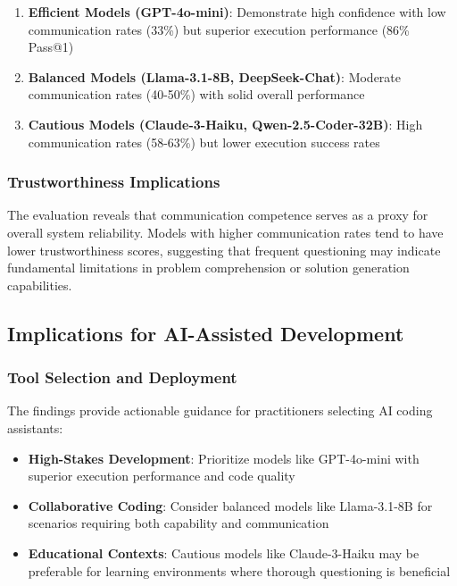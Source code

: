\documentclass[conference]{IEEEtran}
\begin{document}
\begin{enumerate}
    \item \textbf{Efficient Models (GPT-4o-mini)}: Demonstrate high confidence with low communication rates (33\%) but superior execution performance (86\% Pass@1)
    \item \textbf{Balanced Models (Llama-3.1-8B, DeepSeek-Chat)}: Moderate communication rates (40-50\%) with solid overall performance
    \item \textbf{Cautious Models (Claude-3-Haiku, Qwen-2.5-Coder-32B)}: High communication rates (58-63\%) but lower execution success rates
\end{enumerate}

\subsubsection{Trustworthiness Implications}

The evaluation reveals that communication competence serves as a proxy for overall system reliability. Models with higher communication rates tend to have lower trustworthiness scores, suggesting that frequent questioning may indicate fundamental limitations in problem comprehension or solution generation capabilities.

\subsection{Implications for AI-Assisted Development}

\subsubsection{Tool Selection and Deployment}

The findings provide actionable guidance for practitioners selecting AI coding assistants:

\begin{itemize}
    \item \textbf{High-Stakes Development}: Prioritize models like GPT-4o-mini with superior execution performance and code quality
    \item \textbf{Collaborative Coding}: Consider balanced models like Llama-3.1-8B for scenarios requiring both capability and communication
    \item \textbf{Educational Contexts}: Cautious models like Claude-3-Haiku may be preferable for learning environments where thorough questioning is beneficial
\end{itemize}
\end{document}
